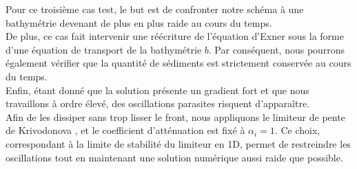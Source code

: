 \documentclass[11pt, a4paper, oneside]{report}
\begin{document}
\begin{samepage}
Pour ce troisième cas test, le but est de confronter notre schéma à une bathymétrie devenant de plus en plus raide au cours du temps. \\
De plus, ce cas fait intervenir une réécriture de l'équation d'Exner sous la forme d'une équation de transport de la bathymétrie $b$. 
Par conséquent, nous pourrons également vérifier que la quantité de sédiments est strictement conservée au cours du temps. \\
Enfin, étant donné que la solution présente un gradient fort et que nous travaillons à ordre élevé, des oscillations parasites risquent d'apparaître. \\
Afin de les dissiper sans trop lisser le front, nous appliquons le limiteur de pente de \mbox{Krivodonova} \cite{krivodonova2007limiters}, et le coefficient d'atténuation est fixé à $\alpha_i = 1$. 
Ce choix, correspondant à la limite de stabilité du limiteur en 1D, permet de restreindre les oscillations tout en maintenant une solution numérique aussi raide que possible. \\


\end{samepage}
\end{document}

